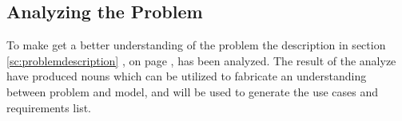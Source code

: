 \subsection{Analyzing the Problem}
To make get a better understanding of the problem the description in section \ref{sc:problemdescription} , on page \pageref{sc:problemdescription}, has been analyzed. The result of the analyze have produced nouns which can be utilized to fabricate an understanding between problem and model, and will be used to generate the use cases and requirements list.